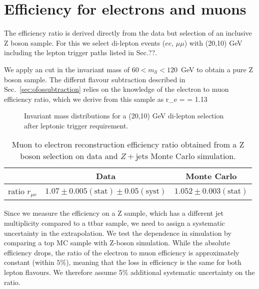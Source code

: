 \section{Efficiency for electrons and muons}\label{sec:eff}

The efficiency ratio is derived directly from the data
but selection of an inclusive Z boson sample.
For this we select di-lepton events ($ee$, $\mu\mu$) 
with (20,10) GeV including the lepton trigger paths
listed in Sec.??.

We apply an cut in the invariant mass of $60 < m_{ll} < 120$~GeV
to obtain a pure Z boson sample. The differnt flavour subtraction 
described in Sec.~\ref{sec:ofossubtraction} relies on the 
knowledge of the electron to muon efficiency ratio, which
we derive from this sample as
\be
    r_{\mu e} =  = 1.13 
\ee

\begin{figure}[hbtp]

  \hfill
  \hfill
  \caption{Invariant mass distributions for a (20,10) GeV di-lepton selection after leptonic 
      trigger requirement.\label{fig:Z_InvMass}}
\end{figure}


\begin{table}[htbp]
\begin{center}
\caption{\label{tab:tnp_eff}Muon to electron reconstruction efficiency ratio 
    obtained from a Z boson selection on data and $Z+\textrm{jets}$ Monte Carlo simulation.} 
\begin{tabular}{lcc}
\hline
            &  Data                                                 & Monte Carlo \\
\hline\hline
\hline
ratio $r_{\mu e}$       & $1.07 \pm 0.005 (\textrm{stat}) \pm 0.05 (\textrm{syst})$    & $1.052 \pm 0.003(\textrm{stat}) $ \\
\hline
\end{tabular}
\end{center}
\end{table}


Since we measure the efficiency on a Z sample, which has a different jet multiplicity
compared to a ttbar sample, we need to assign a systematic uncertainty in the extrapolation.
We test the dependence in simulation by comparing a top MC sample with Z-boson simulation.
While the absolute efficiency drops, the ratio of the electron to muon efficiency
is approximately constant (within $5\%$), meaning that the loss in efficiency is the same for both lepton
flavours. We therefore assume 5\% additional systematic uncertainty on the ratio.
